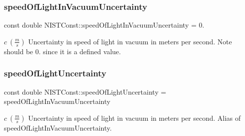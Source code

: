 \subsubsection{\texorpdfstring{speed\+Of\+Light\+In\+Vacuum\+Uncertainty}{speedOfLightInVacuumUncertainty}}
{\footnotesize\ttfamily const double N\+I\+S\+T\+Const\+::speed\+Of\+Light\+In\+Vacuum\+Uncertainty = 0.}

$c \ (\frac{m}{s})$ Uncertainty in speed of light in vacuum in meters per second. Note should be 0. since it is a defined value. \mbox{\label{group___speed_of_light_ga456f26aa497d53d4b78f7a4d7644c269}} 
\subsubsection{\texorpdfstring{speed\+Of\+Light\+Uncertainty}{speedOfLightUncertainty}}
{\footnotesize\ttfamily const double N\+I\+S\+T\+Const\+::speed\+Of\+Light\+Uncertainty = speed\+Of\+Light\+In\+Vacuum\+Uncertainty}

$c \ (\frac{m}{s})$ Uncertainty in speed of light in vacuum in meters per second. Alias of speed\+Of\+Light\+In\+Vacuum\+Uncertainty. 